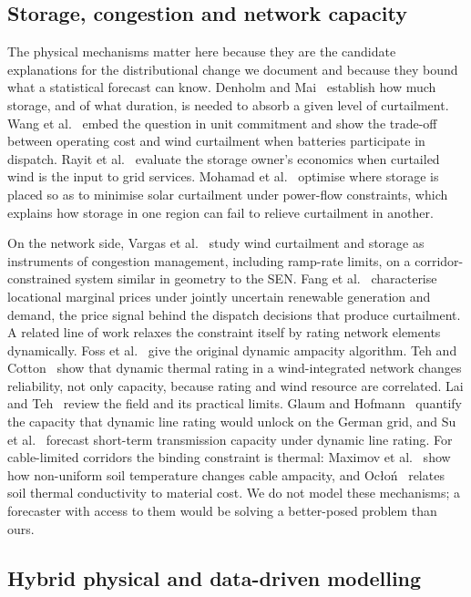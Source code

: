 \subsection{Storage, congestion and network capacity}

The physical mechanisms matter here because they are the candidate explanations for the distributional change we document and because they bound what a statistical forecast can know. Denholm and Mai~\cite{denholm2019} establish how much storage, and of what duration, is needed to absorb a given level of curtailment. Wang et al.~\cite{wang2019} embed the question in unit commitment and show the trade-off between operating cost and wind curtailment when batteries participate in dispatch. Rayit et al.~\cite{rayit2021} evaluate the storage owner's economics when curtailed wind is the input to grid services. Mohamad et al.~\cite{mohamad2021} optimise where storage is placed so as to minimise solar curtailment under power-flow constraints, which explains how storage in one region can fail to relieve curtailment in another.

On the network side, Vargas et al.~\cite{vargas2015} study wind curtailment and storage as instruments of congestion management, including ramp-rate limits, on a corridor-constrained system similar in geometry to the SEN. Fang et al.~\cite{fang2021} characterise locational marginal prices under jointly uncertain renewable generation and demand, the price signal behind the dispatch decisions that produce curtailment. A related line of work relaxes the constraint itself by rating network elements dynamically. Foss et al.~\cite{foss1983} give the original dynamic ampacity algorithm. Teh and Cotton~\cite{teh2016} show that dynamic thermal rating in a wind-integrated network changes reliability, not only capacity, because rating and wind resource are correlated. Lai and Teh~\cite{lai2022} review the field and its practical limits. Glaum and Hofmann~\cite{glaum2023} quantify the capacity that dynamic line rating would unlock on the German grid, and Su et al.~\cite{su2025} forecast short-term transmission capacity under dynamic line rating. For cable-limited corridors the binding constraint is thermal: Maximov et al.~\cite{maximov2016} show how non-uniform soil temperature changes cable ampacity, and Oc\l{}o\'n~\cite{oclon2021} relates soil thermal conductivity to material cost. We do not model these mechanisms; a forecaster with access to them would be solving a better-posed problem than ours.

\subsection{Hybrid physical and data-driven modelling}

